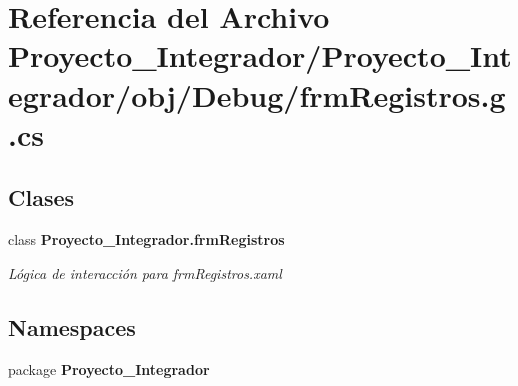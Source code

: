 \section{Referencia del Archivo Proyecto\-\_\-\-Integrador/\-Proyecto\-\_\-\-Integrador/obj/\-Debug/frm\-Registros.g.\-cs}
\label{frm_registros_8g_8cs}
\subsection*{Clases}
\begin{DoxyCompactItemize}
\item 
class {\bf Proyecto\-\_\-\-Integrador.\-frm\-Registros}
\begin{DoxyCompactList}\small\item\em Lógica de interacción para frm\-Registros.\-xaml \end{DoxyCompactList}\end{DoxyCompactItemize}
\subsection*{Namespaces}
\begin{DoxyCompactItemize}
\item 
package {\bf Proyecto\-\_\-\-Integrador}
\end{DoxyCompactItemize}
